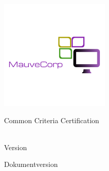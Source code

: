\begin{titlepage}
  \begin{center}
    \includegraphics{../common/media/mauvecorp.png}


    {\large Common Criteria Certification\\[1ex]\bsicertid{} \hspace{1cm} \bsippid{}}

    \vspace{0.5cm}

    {\Large \documenttitle{}}

    \vspace{0.5cm}

    {\large \textsf{\textsc{\thisproductlong{}}\\Version \toeversion{}}}

    \vspace{0.5cm}

    \thiscompany{}

    \vspace{0.5cm}

    Dokumentversion \documentversion{\thisdocument}\\\gitCommitterDate
  \end{center}
\end{titlepage}


